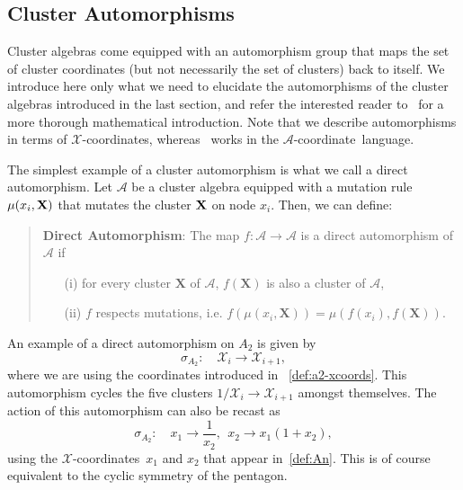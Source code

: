 \documentclass[12pt]{article}
\def\x{\mathcal{X}}
\def\xcoords{$\mathcal{X}$-coordinates}
\def\a{\mathcal{A}}
\def\acoord{$\mathcal{A}$-coordinate}
\begin{document}
\subsection{Cluster Automorphisms}\label{sec:automorphisms}

Cluster algebras come equipped with an automorphism group that maps the set of cluster coordinates (but not necessarily the set of clusters) back to itself. We introduce here only what we need to elucidate the automorphisms of the cluster algebras introduced in the last section, and refer the interested reader to~\cite{Chang:2015} for a more thorough mathematical introduction. Note that we describe automorphisms in terms of \xcoords, whereas~\cite{Chang:2015} works in the \acoord\ language. 

The simplest example of a cluster automorphism is what we call a direct automorphism. Let $\a$ be a cluster algebra equipped with a mutation rule $\mu(x_i, \bf{X})$ that mutates the cluster $\bf{X}$ on node $x_i$. Then, we can define:
\begin{quote}
{\bf Direct Automorphism}: The map $f: \a \to \a$ is a direct automorphism of $\a$ if 
\vspace{-.2cm}
 \begin{itemize}
 \item[(i)] for every cluster $\mathbf{X}$ of $\a$, $f(\mathbf{X})$ is also a cluster of $\a$, 
 \item[(ii)] $f$ respects mutations, i.e. $f(\mu(x_i,\mathbf{X})) = \mu(f(x_i),f(\mathbf{X}))$.
 \end{itemize}
\end{quote}
An example of a direct automorphism on $A_2$ is given by
\begin{equation}
  \sigma_{A_2}:\quad \mathcal{X}_i \to \mathcal{X}_{i+1},
\end{equation}
where we are using the coordinates introduced in ~\eqref{def:a2-xcoords}. This automorphism cycles the five clusters $1/\x_i\to \x_{i+1}$ amongst themselves. The action of this automorphism can also be recast as
\begin{equation}
  \sigma_{A_2}:\quad x_1\to \frac{1}{x_2},~~ x_2\to x_1(1+x_2),
\end{equation}
using the \xcoords\ $x_1$ and $x_2$ that appear in~\eqref{def:An}. This is of course equivalent to the cyclic symmetry of the pentagon. 
\end{document}
